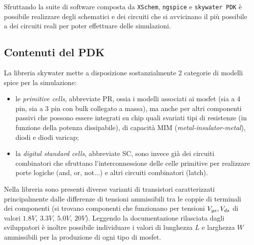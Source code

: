 	
	Sfruttando la suite di software composta da \texttt{XSchem}, \texttt{ngspice} e \texttt{skywater PDK} è possibile realizzare degli schematici e dei circuiti che si avvicinano il più possibile a dei circuiti reali per poter effettuare delle simulazioni.
	
	\subsection*{Contenuti del PDK}
		La libreria skywater mette a disposizione sostanzialmente 2 categorie di modelli spice per la simulazione:
		\begin{itemize}
			\item le \textit{primitive cells}, abbreviate PR, ossia i modelli associati ai mosfet (sia a 4 pin, sia a 3 pin con bulk collegato a massa), ma anche per altri componenti passivi che possono essere integrati su chip quali svariati tipi di resistenze (in funzione della potenza dissipabile), di capacità MIM (\textit{metal-insulator-metal}), diodi e diodi varicap;
			
			\item la \textit{digital standard cells}, abbreviate SC, sono invece già dei circuiti combinatori che sfruttano l'interconnessione delle celle primitive per realizzare porte logiche (and, or, not...) e altri circuiti combinatori (latch).
		\end{itemize}
		
		Nella libreria sono presenti diverse varianti di transistori caratterizzati principalmente dalle differenze di tensioni ammissibili tra le coppie di terminali dei componenti (si trovano componenti che funzionano per tensioni $V_{gs},V_{ds}$ di valori $1.8V,\ 3.3V,\ 5.0V, \ 20V$).  Leggendo la documentazione \cite{specsky} rilasciata dagli sviluppatori è inoltre possibile individuare i valori di lunghezza $L$ e larghezza $W$ ammissibili per la produzione di ogni tipo di mosfet.	
		
